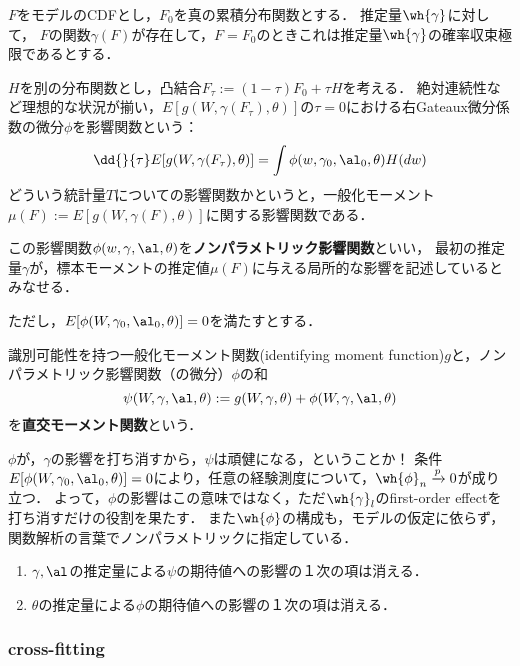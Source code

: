 \documentclass[uplatex,dvipdfmx]{jsreport}
\begin{document}
$F$をモデルのCDFとし，$F_0$を真の累積分布関数とする．
推定量$\wh{\gamma}$に対して，
$F$の関数$\gamma(F)$が存在して，$F=F_0$のときこれは推定量$\wh{\gamma}$の確率収束極限であるとする．

$H$を別の分布関数とし，凸結合$F_\tau:=(1-\tau)F_0+\tau H$を考える．
絶対連続性など理想的な状況が揃い，$E[g(W,\gamma(F_\tau),\theta)]$の$\tau=0$における右Gateaux微分係数の微分$\phi$を影響関数という：
\[\dd{}{\tau}E[g(W,\gamma(F_\tau),\theta)]=\int\phi(w,\gamma_0,\al_0,\theta)H(dw)\]
どういう統計量$T$についての影響関数かというと，一般化モーメント$\mu(F):=E[g(W,\gamma(F),\theta)]$に関する影響関数である．

この影響関数$\phi(w,\gamma,\al,\theta)$を\textbf{ノンパラメトリック影響関数}といい，
最初の推定量$\gamma$が，標本モーメントの推定値$\mu(F)$に与える局所的な影響を記述しているとみなせる．

ただし，$E[\phi(W,\gamma_0,\al_0,\theta)]=0$を満たすとする．

\begin{definition}
    識別可能性を持つ一般化モーメント関数(identifying moment function)$g$と，ノンパラメトリック影響関数（の微分）$\phi$の和
    \[\psi(W,\gamma,\al,\theta):=g(W,\gamma,\theta)+\phi(W,\gamma,\al,\theta)\]
    を\textbf{直交モーメント関数}という．
\end{definition}
\begin{remarks}
    $\phi$が，$\gamma$の影響を打ち消すから，$\psi$は頑健になる，ということか！
    条件$E[\phi(W,\gamma_0,\al_0,\theta)]=0$により，任意の経験測度について，$\wh{\phi}_n\xrightarrow{p}0$が成り立つ．
    よって，$\phi$の影響はこの意味ではなく，ただ$\wh{\gamma}_l$のfirst-order effectを打ち消すだけの役割を果たす．
    また$\wh{\phi}$の構成も，モデルの仮定に依らず，関数解析の言葉でノンパラメトリックに指定している．
\end{remarks}

\begin{theorem}\mbox{}
    \begin{enumerate}
        \item $\gamma,\al$の推定量による$\psi$の期待値への影響の１次の項は消える．
        \item $\theta$の推定量による$\phi$の期待値への影響の１次の項は消える．
    \end{enumerate}
\end{theorem}

\subsubsection{cross-fitting}
\end{document}
